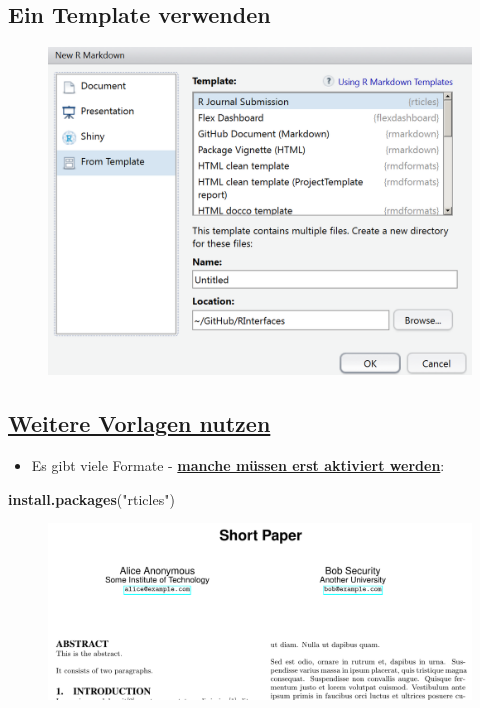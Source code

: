 \documentclass[]{article}
\newenvironment{Shaded}{\begin{snugshade}}{\end{snugshade}}
\newcommand{\KeywordTok}[1]{\textcolor[rgb]{0.13,0.29,0.53}{\textbf{#1}}}
\newcommand{\StringTok}[1]{\textcolor[rgb]{0.31,0.60,0.02}{#1}}
\newcommand{\NormalTok}[1]{#1}
\providecommand{\tightlist}{%
  \setlength{\itemsep}{0pt}\setlength{\parskip}{0pt}}
\begin{document}
\subsection{Ein Template verwenden}\label{ein-template-verwenden}

\begin{figure}
\centering
\includegraphics{figure/UsingTemplate.PNG}
\caption{}
\end{figure}

\subsection{\texorpdfstring{\href{http://rmarkdown.rstudio.com/developer_document_templates.html}{\textbf{Weitere
Vorlagen
nutzen}}}{Weitere Vorlagen nutzen}}\label{weitere-vorlagen-nutzen}

\begin{itemize}
\tightlist
\item
  Es gibt viele Formate -
  \href{https://blog.rstudio.org/2016/03/21/r-markdown-custom-formats/}{\textbf{manche
  müssen erst aktiviert werden}}:
\end{itemize}

\begin{Shaded}
\begin{Highlighting}[]
\KeywordTok{install.packages}\NormalTok{(}\StringTok{"rticles"}\NormalTok{)}
\end{Highlighting}
\end{Shaded}

\begin{figure}
\centering
\includegraphics{figure/ShortPaper.PNG}
\caption{}
\end{figure}
\end{document}
